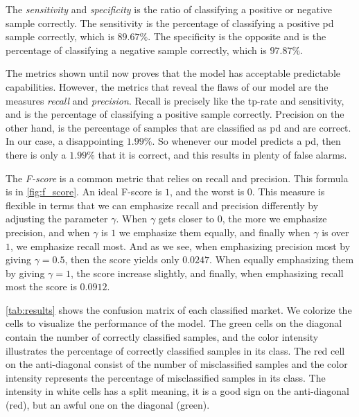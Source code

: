The \emph{sensitivity} and \emph{specificity} is the ratio of classifying a positive or negative sample correctly. The sensitivity is the percentage of classifying a positive \ac{pd} sample correctly, which is $89.67\%$. The specificity is the opposite and is the percentage of classifying a negative sample correctly, which is $97.87\%$.

The metrics shown until now proves that the model has acceptable predictable capabilities. However, the metrics that reveal the flaws of our model are the measures \emph{recall} and \emph{precision}. Recall is precisely like the tp-rate and sensitivity, and is the percentage of classifying a positive sample correctly. Precision on the other hand, is the percentage of samples that are classified as \ac{pd} and are correct. In our case, a disappointing $1.99\%$. So whenever our model predicts a \ac{pd}, then there is only a $1.99\%$ that it is correct, and this results in plenty of false alarms.



The \emph{F-score} is a common metric that relies on recall and precision. This formula is in \autoref{fig:f_score}. An ideal F-score is $1$, and the worst is $0$. This measure is flexible in terms that we can emphasize recall and precision differently by adjusting the parameter $\gamma$. When $\gamma$ gets closer to $0$, the more we emphasize precision, and when $\gamma$ is $1$ we emphasize them equally, and finally when $\gamma$ is over $1$, we emphasize recall most. And as we see, when emphasizing precision most by giving  $\gamma=0.5$, then the score yields only $0.0247$. When equally emphasizing them by giving $\gamma=1$, the score increase slightly, and finally, when emphasizing recall most the score is $0.0912$.

\autoref{tab:results} shows the confusion matrix of each classified market. We colorize the cells to visualize the performance of the model. The green cells on the diagonal contain the number of correctly classified samples, and the color intensity illustrates the percentage of correctly classified samples in its class. The red cell on the anti-diagonal consist of the number of misclassified samples and the color intensity represents the percentage of misclassified samples in its class. The intensity in white cells has a split meaning, it is a good sign on the anti-diagonal (red), but an awful one on the diagonal (green).



\newpage
